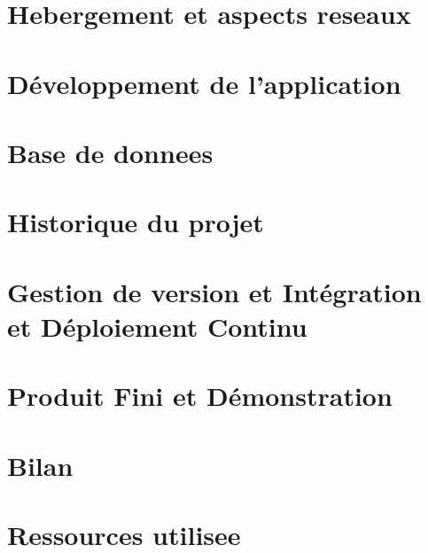 \documentclass[12pt, a4paper, oneside]{article}
\begin{document}
    \section{Hebergement et aspects reseaux}\label{sec:hebergement-et-aspects-reseaux}
    \newpage


    \section{Développement de l'application}\label{sec:developpement-de-l'application}
    \newpage


    \section{Base de donnees}\label{sec:base-de-donnees}
    
    \newpage


    \section{Historique du projet}\label{sec:historique-du-projet}
    
    \newpage


    \section{Gestion de version et Intégration et Déploiement Continu}\label{sec:gestion-de-version-et-integration/-deploiement-continu}
    
    \newpage


    \section{Produit Fini et Démonstration}\label{sec:produit-fini-et-demonstration}
    
    \newpage


    \section{Bilan}\label{sec:bilan}
    


    \section{Ressources utilisee}\label{sec:ressources-utilisee}
    
\end{document}
